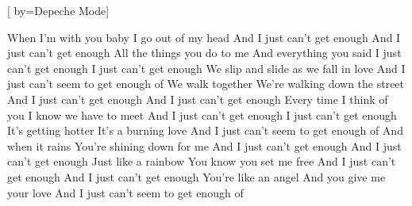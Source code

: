 [
	by={Depeche Mode}]


\beginverse
When I'm with you baby
I go out of my head
And I just can't get enough
And I just can't get enough
All the things you do to me
And everything you said
I just can't get enough
I just can't get enough
\endverse
\beginverse
We slip and slide as we fall in love
And I just can't seem to get enough of
\endverse
\beginverse
We walk together
We're walking down the street
And I just can't get enough
And I just can't get enough
Every time I think of you
I know we have to meet
And I just can't get enough
I just can't get enough
\endverse
\beginverse
It's getting hotter
It's a burning love
And I just can't seem to get enough of
\endverse
\beginverse
And when it rains
You're shining down for me
And I just can't get enough
And I just can't get enough
Just like a rainbow
You know you set me free
And I just can't get enough
And I just can't get enough
\endverse
\beginverse
You're like an angel
And you give me your love
And I just can't seem to get enough of
\endverse

\endsong